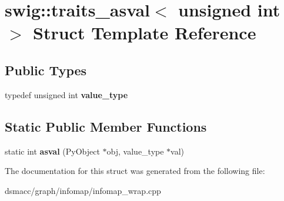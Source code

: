 \hypertarget{structswig_1_1traits__asval_3_01unsigned_01int_01_4}{}\section{swig\+:\+:traits\+\_\+asval$<$ unsigned int $>$ Struct Template Reference}
\label{structswig_1_1traits__asval_3_01unsigned_01int_01_4}
\subsection*{Public Types}
\begin{DoxyCompactItemize}
\item 
\mbox{\label{structswig_1_1traits__asval_3_01unsigned_01int_01_4_a9dc193a600e548c4230b4efd5e16bb4c}} 
typedef unsigned int {\bfseries value\+\_\+type}
\end{DoxyCompactItemize}
\subsection*{Static Public Member Functions}
\begin{DoxyCompactItemize}
\item 
\mbox{\label{structswig_1_1traits__asval_3_01unsigned_01int_01_4_aa08c7b820ef056bf8f92b7982d4b1fab}} 
static int {\bfseries asval} (Py\+Object $\ast$obj, value\+\_\+type $\ast$val)
\end{DoxyCompactItemize}


The documentation for this struct was generated from the following file\+:\begin{DoxyCompactItemize}
\item 
dsmacc/graph/infomap/infomap\+\_\+wrap.\+cpp\end{DoxyCompactItemize}
